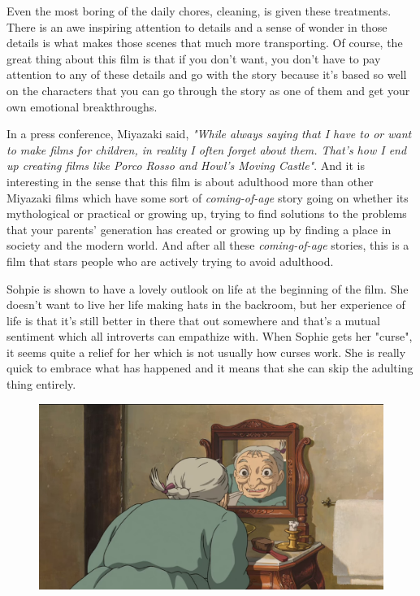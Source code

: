 \documentclass[11pt, letterpaper]{article}
\begin{document}
Even the most boring of the daily chores, cleaning, is given these treatments. There is an awe inspiring attention to details and a sense of wonder in those details is what makes those scenes that much more transporting. Of course, the great thing about this film is that if you don't want, you don't have to pay attention to any of these details and go with the story because it's based so well on the characters that you can go through the story as one of them and get your own emotional breakthroughs. 

In a press conference, Miyazaki said, \textit{"While always saying that I have to or want to make films for children, in reality I often forget about them. That's how I end up creating films like Porco Rosso and Howl's Moving Castle"}. And it is interesting in the sense that this film is about adulthood more than other Miyazaki films which have some sort of \textit{coming-of-age} story going on whether its mythological or practical or growing up, trying to find solutions to the problems that your parents' generation has created or growing up by finding a place in society and the modern world. And after all these \textit{coming-of-age} stories, this is a film that stars people who are actively trying to avoid adulthood. 

Sohpie is shown to have a lovely outlook on life at the beginning of the film. She doesn't want to live her life making hats in the backroom, but her experience of life is that it's still better in there that out somewhere and that's a mutual sentiment which all introverts can empathize with. When Sophie gets her "curse", it seems quite a relief for her which is not usually how curses work. She is really quick to embrace what has happened and it means that she can skip the adulting thing entirely. 

\begin{figure}[H]
\includegraphics[width=\textwidth]{relief.jpg}
\centering
\end{figure}
\end{document}
